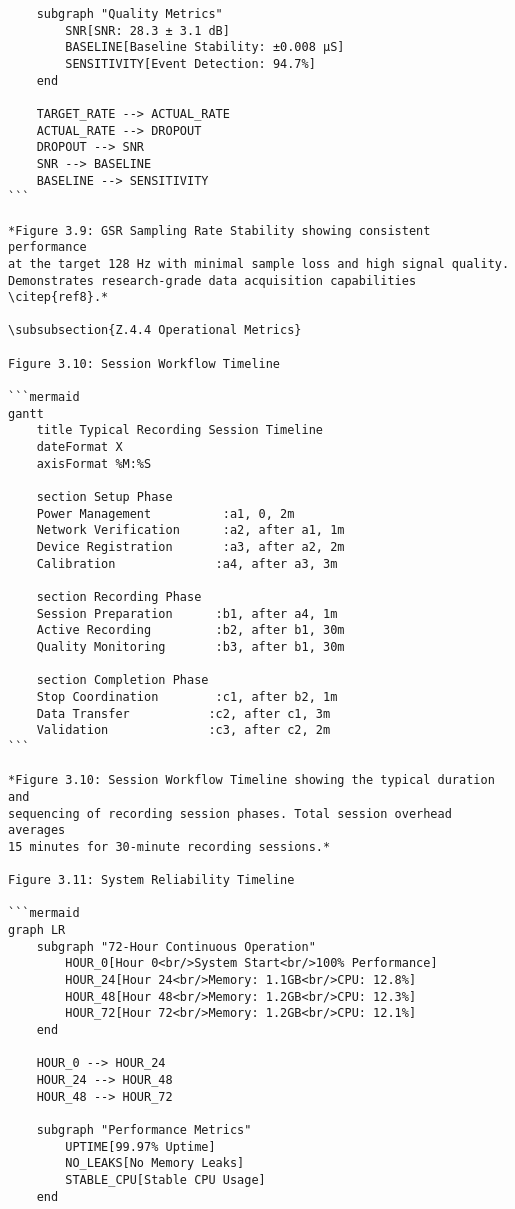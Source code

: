 \begin{verbatim}
    subgraph "Quality Metrics"
        SNR[SNR: 28.3 ± 3.1 dB]
        BASELINE[Baseline Stability: ±0.008 μS]
        SENSITIVITY[Event Detection: 94.7%]
    end

    TARGET_RATE --> ACTUAL_RATE
    ACTUAL_RATE --> DROPOUT
    DROPOUT --> SNR
    SNR --> BASELINE
    BASELINE --> SENSITIVITY
```

*Figure 3.9: GSR Sampling Rate Stability showing consistent performance
at the target 128 Hz with minimal sample loss and high signal quality.
Demonstrates research-grade data acquisition capabilities \citep{ref8}.*

\subsubsection{Z.4.4 Operational Metrics}

Figure 3.10: Session Workflow Timeline

```mermaid
gantt
    title Typical Recording Session Timeline
    dateFormat X
    axisFormat %M:%S

    section Setup Phase
    Power Management          :a1, 0, 2m
    Network Verification      :a2, after a1, 1m
    Device Registration       :a3, after a2, 2m
    Calibration              :a4, after a3, 3m

    section Recording Phase
    Session Preparation      :b1, after a4, 1m
    Active Recording         :b2, after b1, 30m
    Quality Monitoring       :b3, after b1, 30m

    section Completion Phase
    Stop Coordination        :c1, after b2, 1m
    Data Transfer           :c2, after c1, 3m
    Validation              :c3, after c2, 2m
```

*Figure 3.10: Session Workflow Timeline showing the typical duration and
sequencing of recording session phases. Total session overhead averages
15 minutes for 30-minute recording sessions.*

Figure 3.11: System Reliability Timeline

```mermaid
graph LR
    subgraph "72-Hour Continuous Operation"
        HOUR_0[Hour 0<br/>System Start<br/>100% Performance]
        HOUR_24[Hour 24<br/>Memory: 1.1GB<br/>CPU: 12.8%]
        HOUR_48[Hour 48<br/>Memory: 1.2GB<br/>CPU: 12.3%]
        HOUR_72[Hour 72<br/>Memory: 1.2GB<br/>CPU: 12.1%]
    end

    HOUR_0 --> HOUR_24
    HOUR_24 --> HOUR_48
    HOUR_48 --> HOUR_72

    subgraph "Performance Metrics"
        UPTIME[99.97% Uptime]
        NO_LEAKS[No Memory Leaks]
        STABLE_CPU[Stable CPU Usage]
    end


\end{verbatim}

